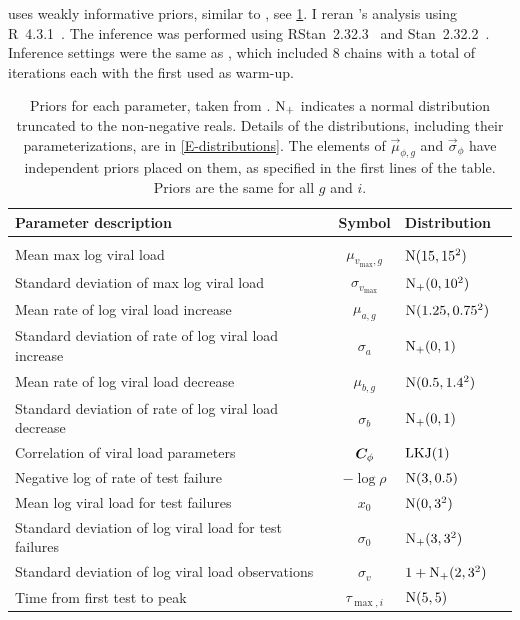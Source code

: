 \documentclass[thesis.tex]{subfiles}
\begin{document}
\textcite{hakkiOnset} uses weakly informative priors, similar to \textcite{singanayagamCommunity}, see \cref{ATACCC:table:hakki-priors}.
I reran \textcite{hakkiOnset}'s analysis using R~4.3.1~\autocite{R-4-3-1}.
The inference was performed using RStan~2.32.3~\autocite{RStan-2-32-3} and Stan~2.32.2~\autocite{Stan-2-32-2}.
Inference settings were the same as \textcite{hakkiOnset}, which included 8 chains with a total of  iterations each with the first  used as warm-up.
\begin{table}
\begin{tabular}{l c l l}
    Parameter description & Symbol & Distribution \\
    \hline \\
    Mean max log viral load & $\mu_{v_\text{max}, g}$ & $\operatorname{N}(15, 15^2)$ \\
    Standard deviation of max log viral load & $\sigma_{v_\text{max}}$ & $\operatorname{N}_+(0, 10^2)$ \\
    Mean rate of log viral load increase & $\mu_{a, g}$ & $\operatorname{N}(1.25, 0.75^2)$ \\
    Standard deviation of rate of log viral load increase & $\sigma_{a}$ & $\operatorname{N}_+(0, 1)$ \\
    Mean rate of log viral load decrease & $\mu_{b, g}$ & $\operatorname{N}(0.5, 1.4^2)$ \\
    Standard deviation of rate of log viral load decrease & $\sigma_{b}$ & $\operatorname{N}_+(0, 1)$ \\
    Correlation of viral load parameters & $\bm{C}_\phi$ & $\operatorname{LKJ}(1)$ \\
    Negative log of rate of test failure & $-\log \rho$ & $\operatorname{N}(3, 0.5)$ \\
    Mean log viral load for test failures & $x_0$ & $\operatorname{N}(0, 3^2)$ \\
    Standard deviation of log viral load for test failures & $\sigma_0$ & $\operatorname{N}_+(3, 3^2)$ \\
    Standard deviation of log viral load observations & $\sigma_v$ & $1 + \operatorname{N}_+(2, 3^2)$ \\
    Time from first test to peak & $\tau_{\max,i}$ & $\operatorname{N}(5,5)$
\end{tabular}
\caption[Viral load model priors]{Priors for each parameter, taken from \textcite{hakkiOnset}. $\operatorname{N}_+$ indicates a normal distribution truncated to the non-negative reals. Details of the distributions, including their parameterizations, are in \cref{E-distributions}. The elements of $\vec{\mu}_{\phi,g}$ and $\vec{\sigma}_\phi$ have independent priors placed on them, as specified in the first lines of the table. Priors are the same for all $g$ and $i$. \label{ATACCC:table:hakki-priors}}
\end{table}
\end{document}
